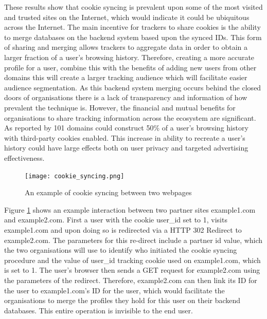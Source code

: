 \documentclass[12pt]{article}
\begin{document}
These results show that cookie syncing is prevalent upon some of the most visited and trusted sites on the Internet, which would indicate it could be ubiquitous across the Internet. The main incentive for trackers to share cookies is the ability to merge databases on the backend system based upon the synced IDs. This form of sharing and merging allows trackers to aggregate data in order to obtain a larger fraction of a user's browsing history. Therefore, creating a more accurate profile for a user, combine this with the benefits of adding new users from other domains this will create a larger tracking audience which will facilitate easier audience segmentation. As this backend system merging occurs behind the closed doors of organisations there is a lack of transparency and information of how prevalent the technique is.  However, the financial and mutual benefits for organisations to share tracking information across the ecosystem are significant. As reported by \parencite{webNeverForgets}  101 domains could construct 50\% of a user's browsing history with third-party cookies enabled. This increase in ability to recreate a user's history could have large effects both on user privacy and targeted advertising effectiveness. \newline

\begin{figure}[H]
    \centering
    \texttt{[image: cookie\_syncing.png]}
    \caption{An example of cookie syncing between two webpages}
    \label{fig:cookie_syncing}
\end{figure}

Figure \ref{fig:cookie_syncing} shows an example interaction between two partner sites example1.com and example2.com. First a user with the cookie user\_id set to 1, visits example1.com and upon doing so is redirected via a HTTP 302 Redirect to example2.com. The parameters for this re-direct include a partner id value, which the two organisations will use to identify who initiated the cookie syncing procedure and the value of user\_id tracking cookie used on example1.com, which is set to 1. The user's browser then sends a GET request for example2.com using the parameters of the redirect. Therefore, example2.com can then link its ID for the user to example1.com’s ID for the user, which would facilitate the organisations to merge the profiles they hold for this user on their backend databases. This entire operation is invisible to the end user. \\
\end{document}

